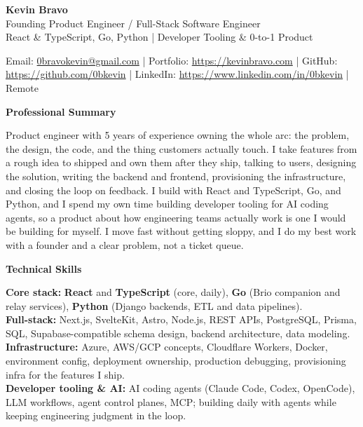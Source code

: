 \documentclass[10pt]{article}
\newcommand{\sectiontitle}[1]{%
    \vspace{5pt}
    \begin{center}
        \textbf{#1}
    \end{center}
    \vspace{-6pt}
}
\begin{document}
\raggedright

\begin{center}
    {\LARGE \textbf{Kevin Bravo}}\\
    Founding Product Engineer / Full-Stack Software Engineer \\
    React \& TypeScript, Go, Python | Developer Tooling \& 0-to-1 Product \\
    \hrulefill
\end{center}

\begin{center}
    Email: \href{mailto:0bravokevin@gmail.com}{0bravokevin@gmail.com}
    | Portfolio: \href{https://kevinbravo.com}{https://kevinbravo.com}
    | GitHub: \href{https://github.com/0bkevin}{https://github.com/0bkevin}
    | LinkedIn: \href{https://www.linkedin.com/in/0bkevin/}{https://www.linkedin.com/in/0bkevin}
    | Remote
\end{center}

\sectiontitle{Professional Summary}
Product engineer with 5 years of experience owning the whole arc: the problem, the design, the code, and the thing customers actually touch. I take features from a rough idea to shipped and own them after they ship, talking to users, designing the solution, writing the backend and frontend, provisioning the infrastructure, and closing the loop on feedback. I build with React and TypeScript, Go, and Python, and I spend my own time building developer tooling for AI coding agents, so a product about how engineering teams actually work is one I would be building for myself. I move fast without getting sloppy, and I do my best work with a founder and a clear problem, not a ticket queue.

\sectiontitle{Technical Skills}
\textbf{Core stack:} \textbf{React} and \textbf{TypeScript} (core, daily), \textbf{Go} (Brio companion and relay services), \textbf{Python} (Django backends, ETL and data pipelines). \\
\textbf{Full-stack:} Next.js, SvelteKit, Astro, Node.js, REST APIs, PostgreSQL, Prisma, SQL, Supabase-compatible schema design, backend architecture, data modeling. \\
\textbf{Infrastructure:} Azure, AWS/GCP concepts, Cloudflare Workers, Docker, environment config, deployment ownership, production debugging, provisioning infra for the features I ship. \\
\textbf{Developer tooling \& AI:} AI coding agents (Claude Code, Codex, OpenCode), LLM workflows, agent control planes, MCP; building daily with agents while keeping engineering judgment in the loop.
\end{document}
